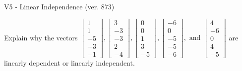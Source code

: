 \begin{exercise}
  \begin{exerciseTitle}V5 - Linear Independence (ver. 873)\end{exerciseTitle}
  \begin{exerciseStatement}
    Explain why the vectors \(\left[\begin{array}{r}
1 \\
1 \\
-5 \\
-3 \\
-1
\end{array}\right] , \left[\begin{array}{r}
3 \\
-3 \\
-3 \\
2 \\
-4
\end{array}\right] , \left[\begin{array}{r}
0 \\
0 \\
1 \\
3 \\
-5
\end{array}\right] , \left[\begin{array}{r}
-6 \\
0 \\
-5 \\
-5 \\
-6
\end{array}\right] , \text{ and } \left[\begin{array}{r}
4 \\
-6 \\
0 \\
4 \\
-5
\end{array}\right]\) are linearly dependent or linearly independent.	



\end{exerciseStatement}
\end{exercise}
